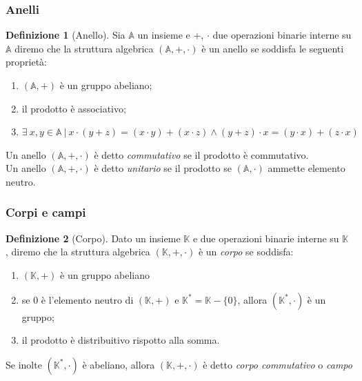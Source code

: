 \documentclass{book}
\theoremstyle{definition}
\newtheorem{definizione}{Definizione}
\newcommand{\An}{\mathbb{A}}
\newcommand{\Anello}{(\An, +, \per)}
\newcommand{\per}{\cdot}
\begin{document}
\subsubsection{Anelli}

\begin{definizione}[Anello]
    Sia $\An$ un insieme e $+$, $\per$ due operazioni binarie interne su $\An$ 
    diremo che la struttura algebrica $(\An, +, \per)$ è un anello se soddisfa le seguenti proprietà:
    \begin{enumerate}[label=(A\arabic*.),itemindent=*]
        \item $(\An, +)$ è un gruppo abeliano;
        \item il prodotto è associativo;
        \item $\exists \ x, y \in \An \ | \ x \per ( y + z ) = (x \per y) + (x \per z) \land ( y + z ) \per x = ( y \per x ) + (z \per x )$
    \end{enumerate}
\end{definizione}

\medskip

Un anello $\Anello$ è detto \emph{commutativo} se il prodotto è commutativo.\\
Un anello $\Anello$ è detto \emph{unitario} se il prodotto se $(\mathbb{A}, \per)$ ammette elemento neutro.

\subsubsection{Corpi e campi}

\begin{definizione}[Corpo]
    Dato un insieme $\mathbb{K}$ e due operazioni binarie interne su $\mathbb{K}$ , diremo che la struttura algebrica $(\mathbb{K} , +, \cdot)$ è un \textit{corpo} se soddisfa:
    \begin{enumerate}[label=(K\arabic*.),itemindent=*]
        \item $(\mathbb{K}, +)$ è un gruppo abeliano
        \item se 0 è l'elemento neutro di $(\mathbb{K}, +)$ e $\mathbb{K}^{*} = \mathbb{K} - \{0\}$, allora $(\mathbb{K}^{*}, \per)$ è un gruppo;
        \item il prodotto è distribuitivo rispotto alla somma.    
    \end{enumerate}

    Se inolte $(\mathbb{K}^{*}, \per)$ è abeliano, allora $(\mathbb{K} , +, \cdot)$ è detto \emph{corpo commutativo} o \emph{campo}
\end{definizione}
\end{document}
